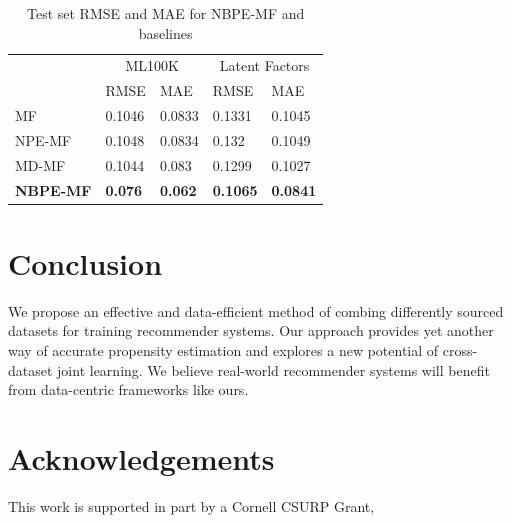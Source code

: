 \documentclass{article}
\begin{document}
\begin{table}
  \caption{Test set RMSE and MAE for NBPE-MF and baselines}
  \label{sample-table}
  \centering
  \begin{tabular}{lllll}
    \toprule               
                     & \multicolumn{2}{c}{ML100K} & \multicolumn{2}{c}{Latent Factors}                                     \\
    \cmidrule(r){2-5}
                     & RMSE                       & MAE                                & RMSE            & MAE             \\
    \midrule
    MF               & 0.1046                     & 0.0833                             & 0.1331          & 0.1045          \\ 
    NPE-MF           & 0.1048                     & 0.0834                             & 0.132           & 0.1049          \\ 
    MD-MF            & 0.1044                     & 0.083                              & 0.1299          & 0.1027          \\
    \textbf{NBPE-MF}& \textbf{0.076}             & \textbf{0.062}                     & \textbf{0.1065} & \textbf{0.0841} \\ 
    \bottomrule
  \end{tabular}
\end{table}

\section{Conclusion}
We propose an effective and data-efficient method of combing differently sourced datasets for training recommender systems. Our approach provides yet another way of accurate propensity estimation and explores a new potential of cross-dataset joint learning. We believe real-world recommender systems will benefit from data-centric frameworks like ours.

\section*{Acknowledgements}
This work is supported in part by a Cornell CSURP Grant,  {}



\end{document}
